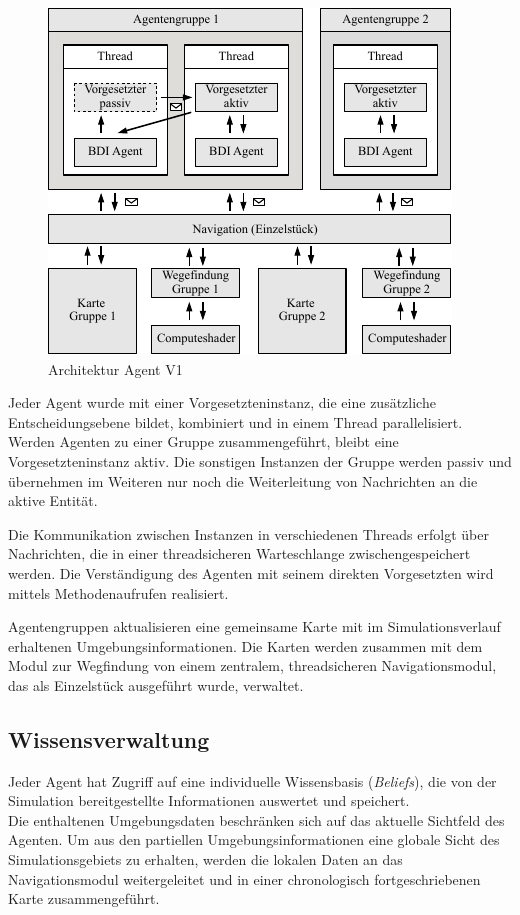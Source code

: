 \documentclass[runningheads]{llncs}
\begin{document}
	\begin{figure}[h]
		\centering
		\includegraphics[scale=1]{./Referenzen/Architekturdiagramm.pdf}
		\caption{Architektur Agent V1}
		\label{g3:architecture}
	\end{figure}
	
	Jeder Agent wurde mit einer Vorgesetzteninstanz, die eine zusätzliche Entscheidungsebene bildet, kombiniert und in einem Thread parallelisiert. Werden Agenten zu einer Gruppe zusammengeführt, bleibt eine Vorgesetzteninstanz aktiv. Die sonstigen Instanzen der Gruppe werden passiv und übernehmen im Weiteren nur noch die Weiterleitung von Nachrichten an die aktive Entität.
	
	Die Kommunikation zwischen Instanzen in verschiedenen Threads erfolgt über Nachrichten, die in einer threadsicheren Warteschlange zwischengespeichert werden. Die Verständigung des Agenten mit seinem direkten Vorgesetzten wird mittels Methodenaufrufen realisiert.
	
	Agentengruppen aktualisieren eine gemeinsame Karte mit im Simulationsverlauf erhaltenen Umgebungsinformationen. Die Karten werden zusammen mit dem Modul zur Wegfindung von einem zentralem, threadsicheren Navigationsmodul, das als Einzelstück ausgeführt wurde, verwaltet. 
	
	
	\subsection{Wissensverwaltung}\label{wissensverwaltung}
	Jeder Agent hat Zugriff auf eine individuelle Wissensbasis (\textit{Beliefs}), die von der Simulation bereitgestellte Informationen auswertet und speichert. \\
	Die enthaltenen Umgebungsdaten beschränken sich auf das aktuelle Sichtfeld des Agenten.
	Um aus den partiellen Umgebungsinformationen eine globale Sicht des Simulationsgebiets zu erhalten, werden die lokalen Daten an das Navigationsmodul weitergeleitet und in einer chronologisch fortgeschriebenen Karte zusammengeführt.
	
\end{document}
